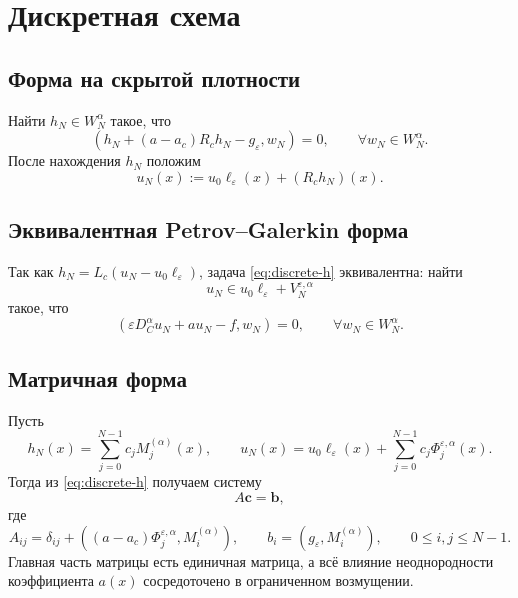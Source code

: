 \documentclass[12pt,a4paper]{article}
\theoremstyle{definition}
\newcommand{\eps}{\varepsilon}
\newcommand{\Dc}{D_C^\alpha}
\newcommand{\Lc}{L_c}
\newcommand{\Rc}{R_c}
\newcommand{\inner}[2]{\left(#1,#2\right)}
\begin{document}
\section{Дискретная схема}

\subsection{Форма на скрытой плотности}

Найти $h_N\in W_N^\alpha$ такое, что
\begin{equation}
\label{eq:discrete-h}
\inner{h_N + (a-a_c)\Rc h_N - g_\eps}{w_N}=0,
\qquad \forall w_N\in W_N^\alpha.
\end{equation}
После нахождения $h_N$ положим
\begin{equation}
\label{eq:uN-from-hN}
u_N(x):=u_0\ell_\eps(x)+(\Rc h_N)(x).
\end{equation}

\subsection{Эквивалентная Petrov--Galerkin форма}

Так как $h_N=\Lc(u_N-u_0\ell_\eps)$, задача \eqref{eq:discrete-h} эквивалентна:
найти
\[
u_N \in u_0\ell_\eps + V_N^{\eps,\alpha}
\]
такое, что
\begin{equation}
\label{eq:discrete-u}
\inner{\eps \Dc u_N + a u_N - f}{w_N}=0,
\qquad \forall w_N\in W_N^\alpha.
\end{equation}

\subsection{Матричная форма}

Пусть
\[
h_N(x)=\sum_{j=0}^{N-1} c_j M_j^{(\alpha)}(x),
\qquad
u_N(x)=u_0\ell_\eps(x)+\sum_{j=0}^{N-1} c_j \Phi_j^{\eps,\alpha}(x).
\]
Тогда из \eqref{eq:discrete-h} получаем систему
\begin{equation}
\label{eq:matrix-system}
A\bm{c}=\bm{b},
\end{equation}
где
\begin{equation}
\label{eq:Aij}
A_{ij}
=
\delta_{ij}
+
\inner{(a-a_c)\Phi_j^{\eps,\alpha}}{M_i^{(\alpha)}},
\qquad
b_i=\inner{g_\eps}{M_i^{(\alpha)}},
\qquad
0\le i,j\le N-1.
\end{equation}
Главная часть матрицы есть единичная матрица, а всё влияние неоднородности коэффициента
$a(x)$ сосредоточено в ограниченном возмущении.
\end{document}

